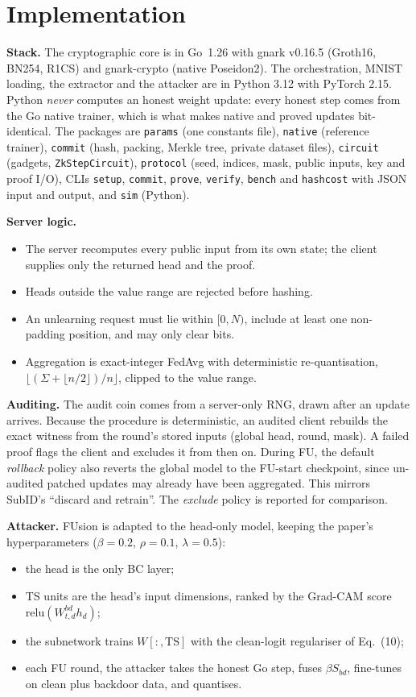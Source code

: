 \documentclass[conference]{IEEEtran}
\newcommand{\code}[1]{\texttt{\small #1}}
\begin{document}
\section{Implementation}\label{sec:impl}
\textbf{Stack.} The cryptographic core is in Go~1.26 with gnark v0.16.5 (Groth16, BN254, R1CS) and
gnark-crypto (native Poseidon2). The orchestration, MNIST loading, the extractor and the attacker
are in Python 3.12 with PyTorch 2.15. Python \emph{never} computes an honest weight update: every
honest step comes from the Go native trainer, which is what makes native and proved updates
bit-identical. The packages are \code{params} (one constants file), \code{native} (reference
trainer), \code{commit} (hash, packing, Merkle tree, private dataset files), \code{circuit}
(gadgets, \code{ZkStepCircuit}), \code{protocol} (seed, indices, mask, public inputs, key and proof
I/O), CLIs \code{setup}, \code{commit}, \code{prove}, \code{verify}, \code{bench} and
\code{hashcost} with JSON input and output, and \code{sim} (Python).

\textbf{Server logic.}
\begin{itemize}
\item The server recomputes every public input from its own state; the client supplies only the
returned head and the proof.
\item Heads outside the value range are rejected before hashing.
\item An unlearning request must lie within $[0,N)$, include at least one non-padding position,
and may only clear bits.
\item Aggregation is exact-integer FedAvg with deterministic re-quantisation,
$\lfloor(\Sigma+\lfloor n/2\rfloor)/n\rfloor$, clipped to the value range.
\end{itemize}

\textbf{Auditing.} The audit coin comes from a server-only RNG, drawn after an update arrives.
Because the procedure is deterministic, an audited client rebuilds the exact witness from the
round's stored inputs (global head, round, mask). A failed proof flags the client and excludes it
from then on. During FU, the default \emph{rollback} policy also reverts the global model to the
FU-start checkpoint, since un-audited patched updates may already have been aggregated. This
mirrors SubID's ``discard and retrain''. The \emph{exclude} policy is reported for comparison.

\textbf{Attacker.} FUsion is adapted to the head-only model, keeping the paper's hyperparameters
($\beta=0.2$, $\rho=0.1$, $\lambda=0.5$):
\begin{itemize}
\item the head is the only BC layer;
\item TS units are the head's input dimensions, ranked by the Grad-CAM score
$\mathrm{relu}(W^{bd}_{t,d}h_d)$;
\item the subnetwork trains $W[:,\text{TS}]$ with the clean-logit regulariser of Eq.~(10);
\item each FU round, the attacker takes the honest Go step, fuses $\beta S_{bd}$, fine-tunes on
clean plus backdoor data, and quantises.
\end{itemize}
\end{document}
